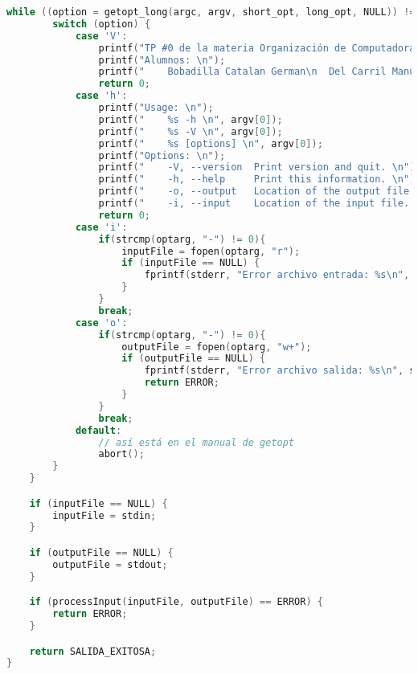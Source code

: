 \documentclass[a4paper]{article}
\begin{document}
\begin{lstlisting}[language=C]
    while ((option = getopt_long(argc, argv, short_opt, long_opt, NULL)) != -1) {
        switch (option) {
            case 'V':
                printf("TP #0 de la materia Organización de Computadoras \n");
                printf("Alumnos: \n");
                printf("	Bobadilla Catalan German\n	Del Carril Manuel \n	Quino Lopez Julian \n");
                return 0;
            case 'h':
                printf("Usage: \n");
                printf("	%s -h \n", argv[0]);
                printf("	%s -V \n", argv[0]);
                printf("	%s [options] \n", argv[0]);
                printf("Options: \n");
                printf("	-V, --version  Print version and quit. \n");
                printf("	-h, --help     Print this information. \n");
                printf("	-o, --output   Location of the output file. \n");
                printf("	-i, --input    Location of the input file. \n");
                return 0;
            case 'i':
            	if(strcmp(optarg, "-") != 0){
					inputFile = fopen(optarg, "r");
					if (inputFile == NULL) {
						fprintf(stderr, "Error archivo entrada: %s\n", strerror(errno));
					}
            	}
                break;
            case 'o':
            	if(strcmp(optarg, "-") != 0){
					outputFile = fopen(optarg, "w+");
					if (outputFile == NULL) {
						fprintf(stderr, "Error archivo salida: %s\n", strerror(errno));
						return ERROR;
					}
            	}
                break;
            default:
                // así está en el manual de getopt
                abort();
        }
    }

    if (inputFile == NULL) {
        inputFile = stdin;
    }

    if (outputFile == NULL) {
        outputFile = stdout;
    }

    if (processInput(inputFile, outputFile) == ERROR) {
    	return ERROR;
    }

    return SALIDA_EXITOSA;
}

\end{lstlisting}
\end{document}
